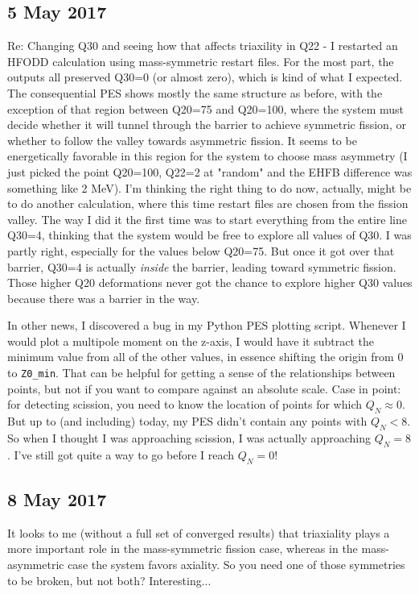 \subsection*{5 May 2017}
Re: Changing Q30 and seeing how that affects triaxility in Q22 - I restarted an HFODD calculation using mass-symmetric  restart files. For the most part, the outputs all preserved Q30=0 (or almost zero), which is kind of what I expected. The consequential PES shows mostly the same structure as before, with the exception of that region between Q20=75 and Q20=100, where the system must decide whether it will tunnel through the barrier to achieve symmetric fission, or whether to follow the valley towards asymmetric fission. It seems to be energetically favorable in this region for the system to choose mass asymmetry (I just picked the point Q20=100, Q22=2 at "random" and the EHFB difference was something like 2 MeV). I'm thinking the right thing to do now, actually, might be to do another calculation, where this time restart files are chosen from the fission valley. The way I did it the first time was to start everything from the entire line Q30=4, thinking that the system would be free to explore all values of Q30. I was partly right, especially for the values below Q20=75. But once it got over that barrier, Q30=4 is actually \textit{inside} the barrier, leading toward symmetric fission. Those higher Q20 deformations never got the chance to explore higher Q30 values because there was a barrier in the way.

In other news, I discovered a bug in my Python PES plotting script. Whenever I would plot a multipole moment on the z-axis, I would have it subtract the minimum value from all of the other values, in essence shifting the origin from 0 to \texttt{Z0\_min}. That can be helpful for getting a sense of the relationships between points, but not if you want to compare against an absolute scale. Case in point: for detecting scission, you need to know the location of points for which $Q_N\approx0$. But up to (and including) today, my PES didn't contain any points with $Q_N < 8$. So when I thought I was approaching scission, I was actually approaching $Q_N=8$. I've still got quite a way to go before I reach $Q_N=0$!

\subsection*{8 May 2017}
It looks to me (without a full set of converged results) that triaxiality plays a more important role in the mass-symmetric fission case, whereas in the mass-asymmetric case the system favors axiality. So you need one of those symmetries to be broken, but not both? Interesting...

